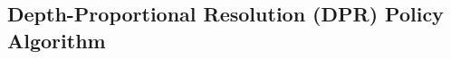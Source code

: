 \subsection{Depth-Proportional Resolution (DPR) Policy Algorithm}
\label{sec:depth-proportional-resolution-algo}

% 

% 

% 
% 
